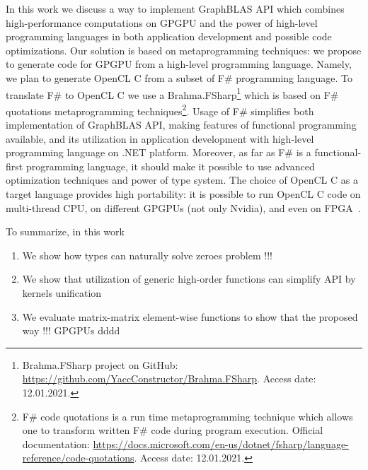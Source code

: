 In this work we discuss a way to implement GraphBLAS API which combines high-performance computations on GPGPU and the power of high-level programming languages in both application development and possible code optimizations.
Our solution is based on metaprogramming techniques: we propose to generate code for GPGPU from a high-level programming language.
Namely, we plan to generate OpenCL C from a subset of  F\# programming language.
To translate F\# to OpenCL C we use a Brahma.FSharp\footnote{Brahma.FSharp project on GitHub: \url{https://github.com/YaccConstructor/Brahma.FSharp}. Access date: 12.01.2021.} which is based on F\# quotations metaprogramming techniques\footnote{F\# code quotations is a run time metaprogramming technique which allows one to transform written F\# code during program execution. Official documentation: \url{https://docs.microsoft.com/en-us/dotnet/fsharp/language-reference/code-quotations}. Access date: 12.01.2021.}.
Usage of F\# simplifies both implementation of GraphBLAS API, making features of functional programming available, and its utilization in application development with high-level programming language on .NET platform. 
Moreover, as far as F\# is a functional-first programming language, it should make it possible to use advanced optimization techniques and power of type system.
The choice of OpenCL C as a target language provides high portability: it is possible to run OpenCL C code on multi-thread CPU, on different GPGPUs (not only Nvidia), and even on FPGA~\cite{kenter2019invited, 6567546}.


To summarize, in this work
\begin{enumerate}
    \item We show how types can naturally solve zeroes problem   !!!
    \item We show that utilization of generic high-order functions can simplify API by kernels unification
    \item We evaluate matrix-matrix element-wise functions to show that the proposed way !!! GPGPUs dddd 
\end{enumerate}   